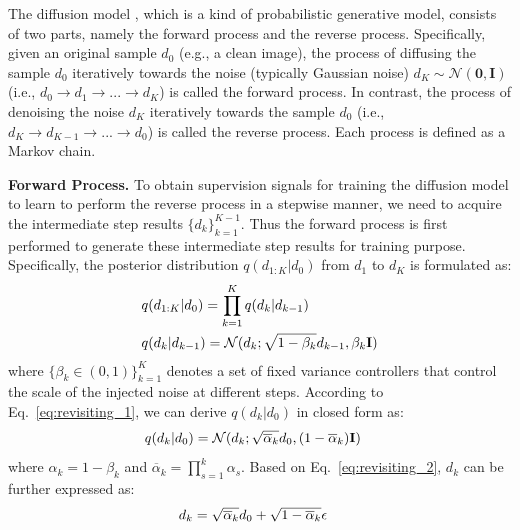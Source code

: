 \documentclass[10pt,twocolumn,letterpaper]{article}
\begin{document}
The diffusion model \cite{NEURIPS2020_DDPM,song2021denoising}, which is a kind of probabilistic generative model, consists of two parts, namely the forward process and the reverse process.
Specifically, given an original sample $d_0$ (e.g., a clean image), the process of diffusing the sample $d_0$ iteratively towards the noise (typically Gaussian noise) $d_K \sim \mathcal{N}(\textbf{0}, \textbf{I})$ (i.e., $d_0 \rightarrow d_1 \rightarrow ... \rightarrow d_K$) is called the forward process. 
In contrast, the process of denoising the noise $d_K$ iteratively towards the sample $d_0$ (i.e., $d_K \rightarrow d_{K-1} \rightarrow ... \rightarrow d_0$) is called the reverse process.
Each process is defined as a Markov chain.

\noindent\textbf{Forward Process.} 
To obtain supervision signals for training the diffusion model to learn to perform the reverse process in a stepwise manner,
we need to acquire the intermediate step results $\{d_k\}^{K-1}_{k=1}$. 
Thus the forward process is first performed to generate these intermediate step results for training purpose.
Specifically, the posterior distribution $q(d_{1:K}|d_0)$ from $d_1$ to $d_K$ is formulated as:
\begin{equation} \label{eq:revisiting_1}
\setlength{\abovedisplayskip}{3pt}
\setlength{\belowdisplayskip}{3pt}
\begin{aligned}
& q(d_{1:K}|d_0) = \prod^K_{k=1}q(d_k|d_{k-1}) \\
& q(d_k|d_{k-1}) = \mathcal{N}(d_k; \sqrt{1-\beta_k}d_{k-1}, \beta_k\textbf{I})
\end{aligned}
\end{equation}
where $\{\beta_k \in (0, 1)\}^K_{k=1}$ denotes a set of fixed variance controllers that control the scale of the injected noise at different steps. 
According to Eq.~\ref{eq:revisiting_1}, we can derive $q(d_k|d_0)$ in closed form as:
\begin{equation} \label{eq:revisiting_2}
\setlength{\abovedisplayskip}{3pt}
\setlength{\belowdisplayskip}{3pt}
\begin{aligned}
& q(d_k|d_0) = \mathcal{N}(d_k; \sqrt{\overline{\alpha}_k}d_0, (1-\overline{\alpha}_k)\textbf{I})
\end{aligned}
\end{equation}
where $\alpha_k = 1 - \beta_k$ and $\overline{\alpha}_k = \prod^k_{s=1} \alpha_s$.  
Based on Eq.~\ref{eq:revisiting_2}, $d_k$ can be further expressed as:
\begin{equation} \label{eq:revisiting_3}
\setlength{\abovedisplayskip}{3pt}
\setlength{\belowdisplayskip}{3pt}
\begin{aligned}
& d_k = \sqrt{\overline{\alpha}_k}d_0 + \sqrt{1 - \overline{\alpha}_k}\epsilon
\end{aligned}
\end{equation}
\end{document}
